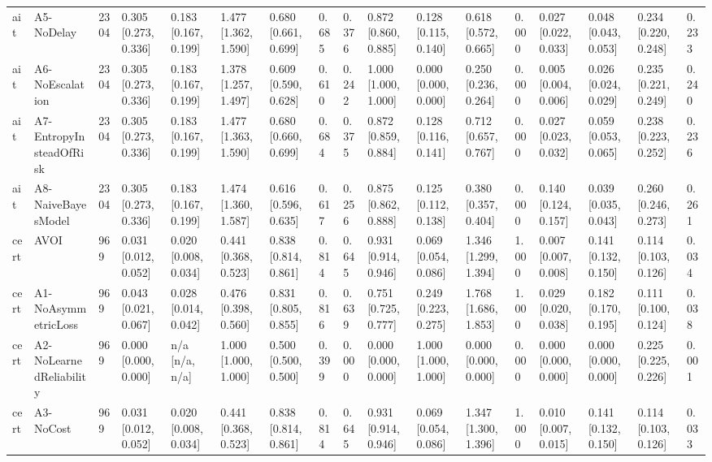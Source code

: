 \begin{table}[!ht]
{\begin{tabular}{lllllllllllllllll}
ait & A5-NoDelay & 2304 & 0.305 [0.273, 0.336] & 0.183 [0.167, 0.199] & 1.477 [1.362, 1.590] & 0.680 [0.661, 0.699] & 0.685 & 0.376 & 0.872 [0.860, 0.885] & 0.128 [0.115, 0.140] & 0.618 [0.572, 0.665] & 0.000 & 0.027 [0.022, 0.033] & 0.048 [0.043, 0.053] & 0.234 [0.220, 0.248] & 0.233 \\
ait & A6-NoEscalation & 2304 & 0.305 [0.273, 0.336] & 0.183 [0.167, 0.199] & 1.378 [1.257, 1.497] & 0.609 [0.590, 0.628] & 0.610 & 0.242 & 1.000 [1.000, 1.000] & 0.000 [0.000, 0.000] & 0.250 [0.236, 0.264] & 0.000 & 0.005 [0.004, 0.006] & 0.026 [0.024, 0.029] & 0.235 [0.221, 0.249] & 0.240 \\
ait & A7-EntropyInsteadOfRisk & 2304 & 0.305 [0.273, 0.336] & 0.183 [0.167, 0.199] & 1.477 [1.363, 1.590] & 0.680 [0.660, 0.699] & 0.684 & 0.375 & 0.872 [0.859, 0.884] & 0.128 [0.116, 0.141] & 0.712 [0.657, 0.767] & 0.000 & 0.027 [0.023, 0.032] & 0.059 [0.053, 0.065] & 0.238 [0.223, 0.252] & 0.236 \\
ait & A8-NaiveBayesModel & 2304 & 0.305 [0.273, 0.336] & 0.183 [0.167, 0.199] & 1.474 [1.360, 1.587] & 0.616 [0.596, 0.635] & 0.617 & 0.256 & 0.875 [0.862, 0.888] & 0.125 [0.112, 0.138] & 0.380 [0.357, 0.404] & 0.000 & 0.140 [0.124, 0.157] & 0.039 [0.035, 0.043] & 0.260 [0.246, 0.273] & 0.261 \\
cert & AVOI & 969 & 0.031 [0.012, 0.052] & 0.020 [0.008, 0.034] & 0.441 [0.368, 0.523] & 0.838 [0.814, 0.861] & 0.814 & 0.645 & 0.931 [0.914, 0.946] & 0.069 [0.054, 0.086] & 1.346 [1.299, 1.394] & 1.000 & 0.007 [0.007, 0.008] & 0.141 [0.132, 0.150] & 0.114 [0.103, 0.126] & 0.034 \\
cert & A1-NoAsymmetricLoss & 969 & 0.043 [0.021, 0.067] & 0.028 [0.014, 0.042] & 0.476 [0.398, 0.560] & 0.831 [0.805, 0.855] & 0.816 & 0.639 & 0.751 [0.725, 0.777] & 0.249 [0.223, 0.275] & 1.768 [1.686, 1.853] & 1.000 & 0.029 [0.020, 0.038] & 0.182 [0.170, 0.195] & 0.111 [0.100, 0.124] & 0.038 \\
cert & A2-NoLearnedReliability & 969 & 0.000 [0.000, 0.000] & n/a [n/a, n/a] & 1.000 [1.000, 1.000] & 0.500 [0.500, 0.500] & 0.399 & 0.000 & 0.000 [0.000, 0.000] & 1.000 [1.000, 1.000] & 0.000 [0.000, 0.000] & 0.000 & 0.000 [0.000, 0.000] & 0.000 [0.000, 0.000] & 0.225 [0.225, 0.226] & 0.001 \\
cert & A3-NoCost & 969 & 0.031 [0.012, 0.052] & 0.020 [0.008, 0.034] & 0.441 [0.368, 0.523] & 0.838 [0.814, 0.861] & 0.814 & 0.645 & 0.931 [0.914, 0.946] & 0.069 [0.054, 0.086] & 1.347 [1.300, 1.396] & 1.000 & 0.010 [0.007, 0.015] & 0.141 [0.132, 0.150] & 0.114 [0.103, 0.126] & 0.033 \\

\end{tabular}}
\end{table}

